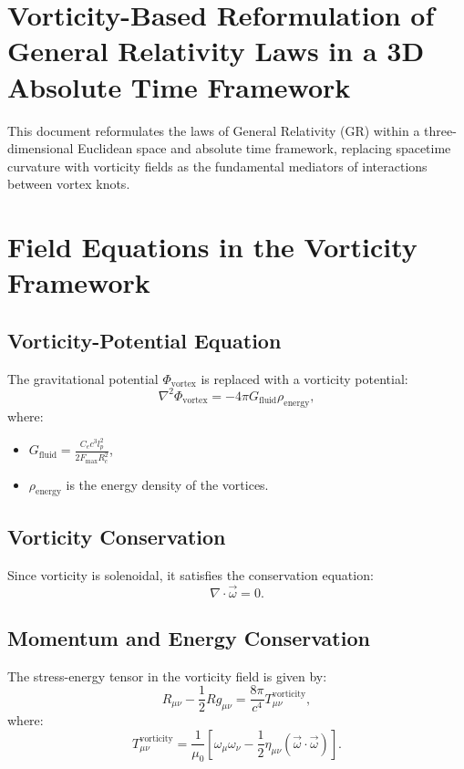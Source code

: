     \section{Vorticity-Based Reformulation of General Relativity Laws in a 3D Absolute Time Framework}
    This document reformulates the laws of General Relativity (GR) within a three-dimensional Euclidean space and absolute time framework, replacing spacetime curvature with vorticity fields as the fundamental mediators of interactions between vortex knots.

    \section{Field Equations in the Vorticity Framework}

    \subsection{Vorticity-Potential Equation}
    The gravitational potential $\Phi_{\text{vortex}}$ is replaced with a vorticity potential:
    \begin{equation}
        \nabla^2 \Phi_{\text{vortex}} = -4 \pi G_{\text{fluid}} \rho_{\text{energy}},
    \end{equation}
    where:
    \begin{itemize}
        \item $G_{\text{fluid}} = \frac{C_e c^3 l_p^2}{2 F_{\text{max}} R_c^2}$,
        \item $\rho_{\text{energy}}$ is the energy density of the vortices.
    \end{itemize}

    \subsection{Vorticity Conservation}
    Since vorticity is solenoidal, it satisfies the conservation equation:
    \begin{equation}
        \nabla \cdot \vec{\omega} = 0.
    \end{equation}

    \subsection{Momentum and Energy Conservation}
    The stress-energy tensor in the vorticity field is given by:
    \begin{equation}
        R_{\mu \nu} - \frac{1}{2} R g_{\mu \nu} = \frac{8 \pi}{c^4} T_{\mu \nu}^{\text{vorticity}},
    \end{equation}
    where:
    \begin{equation}
        T_{\mu \nu}^{\text{vorticity}} = \frac{1}{\mu_0} \left[ \omega_\mu \omega_\nu - \frac{1}{2} \eta_{\mu \nu} (\vec{\omega} \cdot \vec{\omega}) \right].
    \end{equation}

